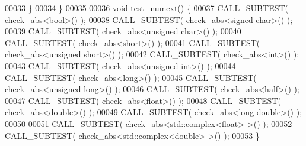 \begin{DoxyCode}
00033   \}
00034 \}
00035 
00036 \textcolor{keywordtype}{void} test\_numext() \{
00037   CALL\_SUBTEST( check\_abs<bool>() );
00038   CALL\_SUBTEST( check\_abs<signed char>() );
00039   CALL\_SUBTEST( check\_abs<unsigned char>() );
00040   CALL\_SUBTEST( check\_abs<short>() );
00041   CALL\_SUBTEST( check\_abs<unsigned short>() );
00042   CALL\_SUBTEST( check\_abs<int>() );
00043   CALL\_SUBTEST( check\_abs<unsigned int>() );
00044   CALL\_SUBTEST( check\_abs<long>() );
00045   CALL\_SUBTEST( check\_abs<unsigned long>() );
00046   CALL\_SUBTEST( check\_abs<half>() );
00047   CALL\_SUBTEST( check\_abs<float>() );
00048   CALL\_SUBTEST( check\_abs<double>() );
00049   CALL\_SUBTEST( check\_abs<long double>() );
00050 
00051   CALL\_SUBTEST( check\_abs<std::complex<float> >() );
00052   CALL\_SUBTEST( check\_abs<std::complex<double> >() );
00053 \}
\end{DoxyCode}
